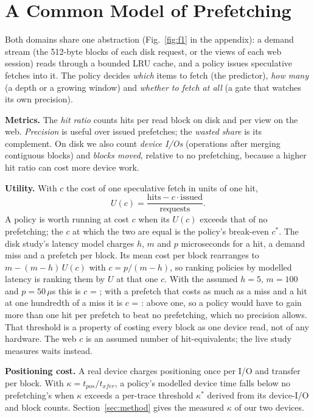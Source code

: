 
\section{A Common Model of Prefetching}\label{sec:model}

Both domains share one abstraction (Fig.~\ref{fig:f1} in the appendix): a demand stream (the
512-byte blocks of each disk request, or the views of each web session) reads
through a bounded LRU cache, and a policy issues speculative fetches into it.
The policy decides \emph{which} items to fetch (the predictor), \emph{how
many} (a depth or a growing window) and \emph{whether to fetch at all} (a gate
that watches its own precision).

\textbf{Metrics.} The \emph{hit ratio} counts hits per read block on disk and
per view on the web. \emph{Precision} is useful over issued prefetches; the
\emph{wasted share} is its complement. On disk we also count \emph{device
I/Os} (operations after merging contiguous blocks) and \emph{blocks moved},
relative to no prefetching, because a higher hit ratio can cost more device
work.

\textbf{Utility.} With $c$ the cost of one speculative fetch in units of one
hit,
\begin{equation}
U(c) = \frac{\mathrm{hits} - c \cdot \mathrm{issued}}{\mathrm{requests}} .
\label{eq:utility}
\end{equation}
A policy is worth running at cost $c$ when its $U(c)$ exceeds that of no
prefetching; the $c$ at which the two are equal is the policy's break-even
$c^*$. The disk study's latency model charges $h$, $m$ and $p$ microseconds
for a hit, a demand miss and a prefetch per block. Its mean cost per block
rearranges to $m - (m-h)\,U(c)$ with $c = p/(m-h)$, so ranking policies by
modelled latency is ranking them by $U$ at that one $c$. With the assumed
$h = 5$, $m = 100$ and $p = 50$\,$\mu$s this is $c$ = \diskAssumedC; with a
prefetch that costs as much as a miss and a hit at one hundredth of a miss it
is $c$ = \diskBreakEvenC: above one, so a policy would have to gain more than
one hit per prefetch to beat no prefetching, which no precision allows. That threshold is a property of costing every block as one
device read, not of any hardware. The web $c$ is an assumed number of
hit-equivalents; the live study measures waits instead.

\textbf{Positioning cost.} A real device charges positioning once per I/O and
transfer per block. With $\kappa = t_{pos}/t_{xfer}$, a policy's modelled device
time falls below no prefetching's when $\kappa$ exceeds a per-trace threshold
$\kappa^*$ derived from its device-I/O and block counts. Section~\ref{sec:method}
gives the measured $\kappa$ of our two devices.
